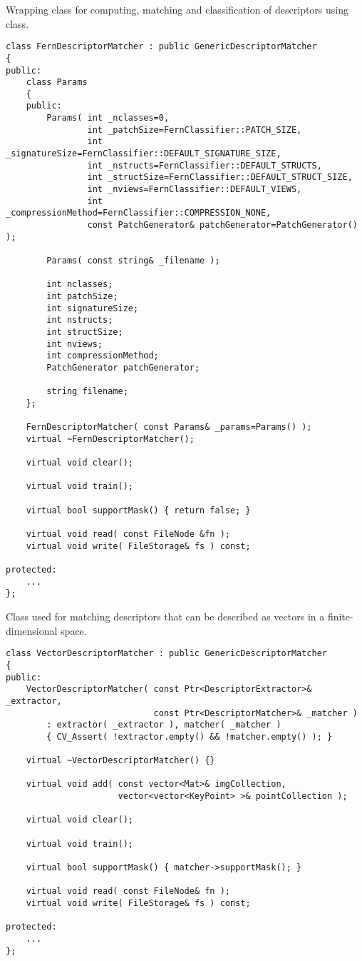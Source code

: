 Wrapping class for computing, matching and classification of descriptors using  class.

\begin{lstlisting}
class FernDescriptorMatcher : public GenericDescriptorMatcher
{
public:
    class Params
    {
    public:
        Params( int _nclasses=0,
                int _patchSize=FernClassifier::PATCH_SIZE,
                int _signatureSize=FernClassifier::DEFAULT_SIGNATURE_SIZE,
                int _nstructs=FernClassifier::DEFAULT_STRUCTS,
                int _structSize=FernClassifier::DEFAULT_STRUCT_SIZE,
                int _nviews=FernClassifier::DEFAULT_VIEWS,
                int _compressionMethod=FernClassifier::COMPRESSION_NONE,
                const PatchGenerator& patchGenerator=PatchGenerator() );

        Params( const string& _filename );

        int nclasses;
        int patchSize;
        int signatureSize;
        int nstructs;
        int structSize;
        int nviews;
        int compressionMethod;
        PatchGenerator patchGenerator;

        string filename;
    };

    FernDescriptorMatcher( const Params& _params=Params() );
    virtual ~FernDescriptorMatcher();

    virtual void clear();

    virtual void train();

    virtual bool supportMask() { return false; }

    virtual void read( const FileNode &fn );
    virtual void write( FileStorage& fs ) const;
    
protected:
	...
};
\end{lstlisting}

Class used for matching descriptors that can be described as vectors in a finite-dimensional space.

\begin{lstlisting}
class VectorDescriptorMatcher : public GenericDescriptorMatcher
{
public:
    VectorDescriptorMatcher( const Ptr<DescriptorExtractor>& _extractor, 
                             const Ptr<DescriptorMatcher>& _matcher ) 
	    : extractor( _extractor ), matcher( _matcher ) 
        { CV_Assert( !extractor.empty() && !matcher.empty() ); }
        
    virtual ~VectorDescriptorMatcher() {}

    virtual void add( const vector<Mat>& imgCollection,
                      vector<vector<KeyPoint> >& pointCollection );

    virtual void clear();

    virtual void train();

    virtual bool supportMask() { matcher->supportMask(); }

    virtual void read( const FileNode& fn );
    virtual void write( FileStorage& fs ) const;

protected:
    ...
};
\end{lstlisting}

